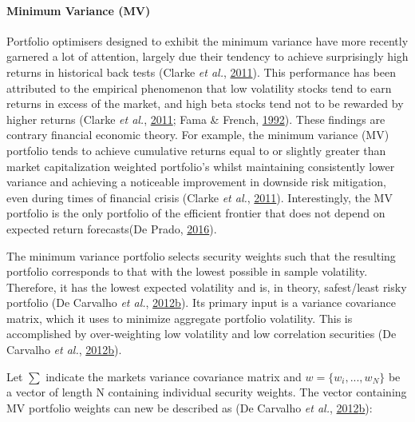 \documentclass[11pt,preprint, authoryear]{elsarticle}
\numberwithin{equation}{section}
\numberwithin{figure}{section}
\numberwithin{table}{section}
\begin{document}
\hypertarget{minimum-variance-mv}{%
\paragraph{Minimum Variance (MV)}\label{minimum-variance-mv}}

Portfolio optimisers designed to exhibit the minimum variance have more
recently garnered a lot of attention, largely due their tendency to
achieve surprisingly high returns in historical back tests (Clarke
\emph{et al.}, \protect\hyperlink{ref-clarke2011}{2011}). This
performance has been attributed to the empirical phenomenon that low
volatility stocks tend to earn returns in excess of the market, and high
beta stocks tend not to be rewarded by higher returns (Clarke \emph{et
al.}, \protect\hyperlink{ref-clarke2011}{2011}; Fama \& French,
\protect\hyperlink{ref-fama1992}{1992}). These findings are contrary
financial economic theory. For example, the minimum variance (MV)
portfolio tends to achieve cumulative returns equal to or slightly
greater than market capitalization weighted portfolio's whilst
maintaining consistently lower variance and achieving a noticeable
improvement in downside risk mitigation, even during times of financial
crisis (Clarke \emph{et al.}, \protect\hyperlink{ref-clarke2011}{2011}).
Interestingly, the MV portfolio is the only portfolio of the efficient
frontier that does not depend on expected return forecasts(De Prado,
\protect\hyperlink{ref-lopez}{2016}).

The minimum variance portfolio selects security weights such that the
resulting portfolio corresponds to that with the lowest possible in
sample volatility. Therefore, it has the lowest expected volatility and
is, in theory, safest/least risky portfolio (De Carvalho \emph{et al.},
\protect\hyperlink{ref-rawl2012}{2012}\protect\hyperlink{ref-rawl2012}{b}).
Its primary input is a variance covariance matrix, which it uses to
minimize aggregate portfolio volatility. This is accomplished by
over-weighting low volatility and low correlation securities (De
Carvalho \emph{et al.},
\protect\hyperlink{ref-rawl2012}{2012}\protect\hyperlink{ref-rawl2012}{b}).

Let \(\sum\) indicate the markets variance covariance matrix and
\(w=\{w_i,..., w_N \}\) be a vector of length N containing individual
security weights. The vector containing MV portfolio weights can new be
described as (De Carvalho \emph{et al.},
\protect\hyperlink{ref-rawl2012}{2012}\protect\hyperlink{ref-rawl2012}{b}):
\end{document}
